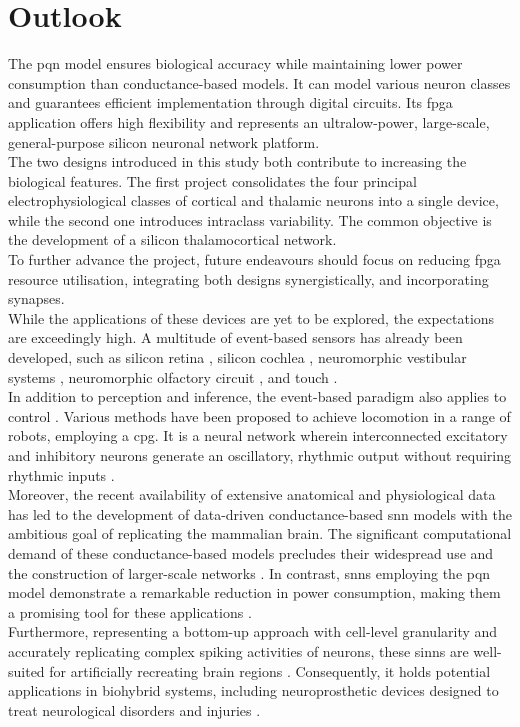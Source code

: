 \chapter{Outlook}
\label{ch6}
The \acrshort{pqn} model ensures biological accuracy while maintaining lower power 
consumption than conductance-based models. It can model various neuron classes and 
guarantees efficient implementation through digital circuits. Its \acrshort{fpga} 
application offers high flexibility and represents an ultralow-power, large-scale, 
general-purpose silicon neuronal network platform.\\
The two designs introduced in this study both contribute to increasing the 
biological features. The first project consolidates the four principal electrophysiological 
classes of cortical and thalamic neurons into a single device, while the second one introduces 
intraclass variability. The common objective is the development of a silicon thalamocortical network.\\
To further advance the project, future endeavours should focus on reducing \acrshort{fpga} 
resource utilisation, integrating both designs synergistically, and incorporating synapses.\\

While the applications of these devices are yet to be explored, the expectations are exceedingly high. 
A multitude of event-based sensors has already been developed, such as silicon retina \cite{Mahowald}, 
silicon cochlea \cite{Lyon,Liu}, neuromorphic vestibular systems \cite{Corradi}, neuromorphic olfactory 
circuit \cite{Koickal}, and touch \cite{Bartolozzi}.\\
In addition to perception and inference, the event-based paradigm also applies 
to control \cite{Yamazaki}. Various methods have been proposed to achieve locomotion 
in a range of robots, employing a \acrfull{cpg}. It is a neural network 
wherein interconnected excitatory and inhibitory neurons generate an oscillatory, 
rhythmic output without requiring rhythmic inputs \cite{Katz}.\\

Moreover, the recent availability of extensive anatomical and physiological data 
has led to the development of data-driven conductance-based \acrshort{snn} 
models \cite{Markram,Bezaire,Ecker} with the ambitious goal of replicating 
the mammalian brain. The significant computational demand of these 
conductance-based models precludes their widespread use and the construction 
of larger-scale networks \cite{Bezaire}. In contrast, \acrshort{snn}s employing the 
\acrshort{pqn} model demonstrate a remarkable reduction in power consumption, 
making them a promising tool for these applications \cite{Nanami}.\\
Furthermore, representing a bottom-up approach with cell-level granularity 
and accurately replicating complex spiking activities of neurons, these \acrshort{sinn}s
are well-suited for artificially recreating brain regions \cite{KohnoR}. 
Consequently, it holds potential applications in biohybrid systems, including 
neuroprosthetic devices designed to treat neurological disorders and injuries \cite{Chiappalone}.\\

